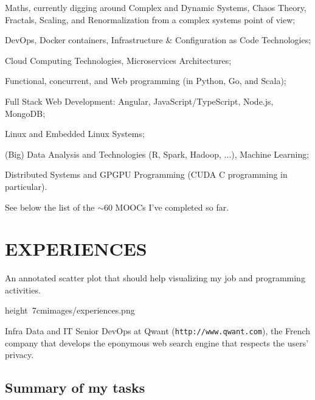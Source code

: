 \bgroup
\item{\bdot}
    Maths, currently digging around Complex and Dynamic Systems, Chaos Theory,
    Fractals, Scaling, and Renormalization from a complex systems point of view;
\item{\bdot}
    DevOps, Docker containers, Infrastructure \& Configuration as Code Technologies;
\item{\bdot}
    Cloud Computing Technologies, Microservices Architectures;
\item{\bdot}
    Functional, concurrent, and Web programming (in Python, Go, and Scala);
\item{\bdot}
    Full Stack Web Development: Angular, JavaScript/TypeScript, Node.js, MongoDB;
\item{\bdot}
    Linux and Embedded Linux Systems;
\item{\bdot}
    (Big) Data Analysis and Technologies (R, Spark, Hadoop, ...), Machine Learning;
\item{\bdot}
    Distributed Systems and GPGPU Programming
    (CUDA C\plusplus{} programming in particular).
\egroup

\smallskip\nobreak\noindent
See below the list of the $\sim$60 MOOCs I've completed so far.
\vfill\eject


\section{EXPERIENCES}

An annotated scatter plot that should help visualizing my job and programming activities.

\bigskip
\centerline{%
    \hbox{\pdfximage height 7cm{images/experiences.png}\pdfrefximage\pdflastximage}}
\smallskip



Infra Data and IT Senior DevOps at Qwant ({\tt http://www.qwant.com}), the
French company that develops the eponymous web search engine that respects the
users' privacy.

\subsection{Summary of my tasks}

